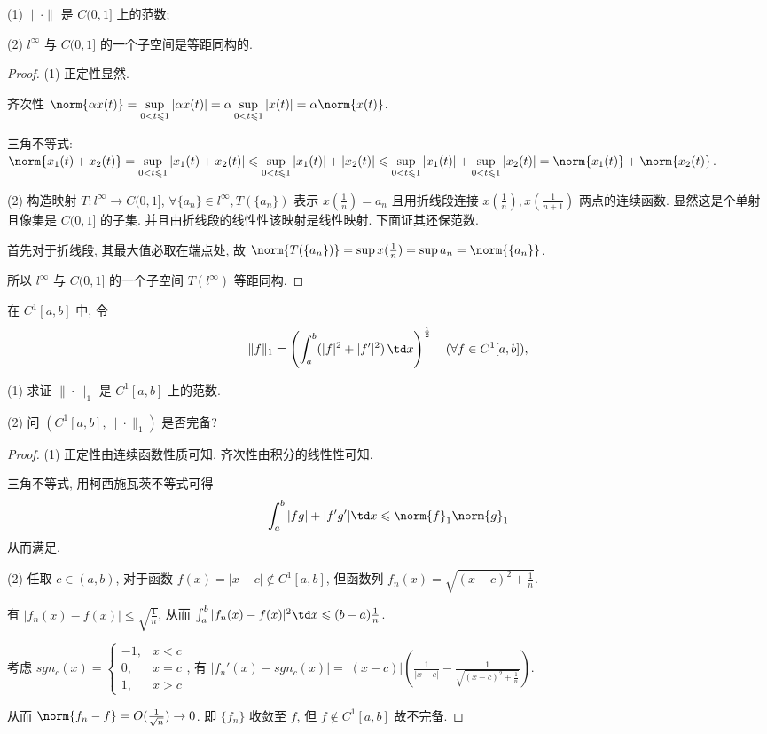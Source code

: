(1) $\|\cdot\|$ 是 $C(0,1]$ 上的范数;

(2) $l^\infty$ 与 $C(0,1]$ 的一个子空间是等距同构的.

\begin{proof}
	(1) 正定性显然.

	齐次性 $\norm{\alpha x(t)}=\sup\limits_{0<t\leqslant 1}|\alpha x(t)|=\alpha\sup\limits_{0<t\leqslant 1}|x(t)|=\alpha\norm{x(t)}$.

	三角不等式: $\norm{x_1(t)+x_2(t)}=\sup\limits_{0<t\leqslant 1}|x_1(t)+x_2(t)|\leqslant \sup\limits_{0<t\leqslant 1}|x_1(t)|+|x_2(t)|\leqslant \sup\limits_{0<t\leqslant 1}|x_1(t)|+\sup\limits_{0<t\leqslant 1}|x_2(t)|=\norm{x_1(t)}+\norm{x_2(t)}$.

	(2) 构造映射 $T: l^\infty\to C(0,1]$, $\forall \{a_n\}\in l^\infty, T(\{a_n\})$ 表示 $x(\frac1n)=a_n$ 且用折线段连接 $x(\frac 1n),x(\frac1{n+1})$ 两点的连续函数. 显然这是个单射且像集是 $C(0,1]$ 的子集. 并且由折线段的线性性该映射是线性映射. 下面证其还保范数.

	首先对于折线段, 其最大值必取在端点处, 故 $\norm{T(\{a_n\})}=\sup x(\frac 1 n)=\sup a_n=\norm{\{a_n\}}$.

	所以 $l^\infty$ 与 $C(0,1]$ 的一个子空间 $T(l^\infty)$ 等距同构.

\end{proof}

\problem[1.4.3]在 $C^1[a,b]$ 中, 令
\[
\|f\|_1 = \left( \int_a^b (|f|^2 + |f'|^2) \, \td x \right)^{\frac{1}{2}} \quad (\forall f \in C^1[a,b]),
\]

(1) 求证 $\|\cdot\|_1$ 是 $C^1[a,b]$ 上的范数.

(2) 问 $(C^1[a,b], \|\cdot\|_1)$ 是否完备?

\begin{proof}
	(1) 正定性由连续函数性质可知. 齐次性由积分的线性性可知.

	三角不等式, 用柯西施瓦茨不等式可得 $$\int_a^b |fg|+|f'g'|\td x\leqslant \norm{f}_1\norm{g}_1$$ 从而满足.

	(2) 任取 $c\in (a,b)$, 对于函数 $f(x)=|x-c|\notin C^1[a,b]$, 但函数列 $f_n(x)=\sqrt{(x-c)^2+\frac 1n}$.

	有 $|f_n(x)-f(x)|\leqslant\sqrt{\frac1n}$, 从而 $\int_a^b |f_n(x)-f(x)|^2\td x\leqslant (b-a)\frac1n$.

	考虑 $sgn_c(x)=\left\lbrace\begin{array}{ll}
		-1,& x<c\\
		0, & x=c\\
		1, & x>c
	\end{array}\right.$, 有 $|f_n'(x)-sgn_c(x)|=|(x-c)|(\frac{1}{|x-c|}-\frac{1}{\sqrt{(x-c)^2+\frac 1 n}})$.

	从而 $\norm{f_n-f}=O(\frac{1}{\sqrt n})\to 0$. 即 $\{f_n\}$ 收敛至 $f$, 但 $f\notin C^1[a,b]$ 故不完备.
\end{proof}


